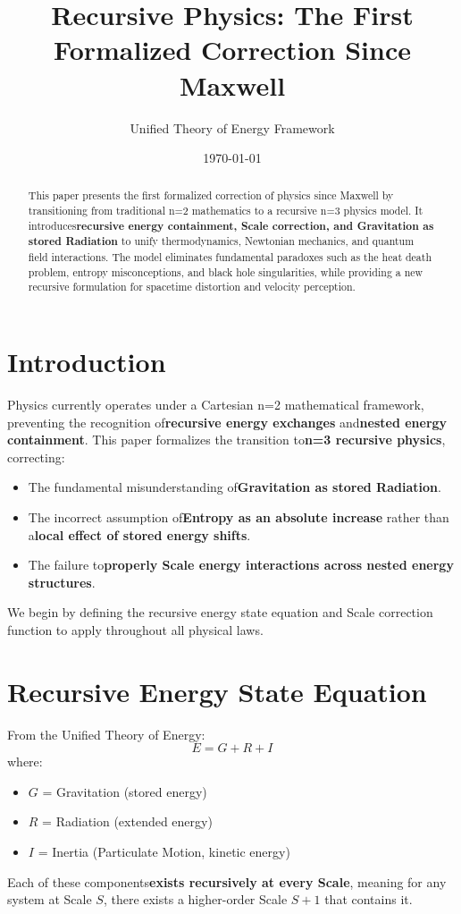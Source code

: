 \documentclass{article}
\title{Recursive Physics: The First Formalized Correction Since Maxwell}
\author{Unified Theory of Energy Framework}
\date{\today}
\begin{document}
\maketitle

\begin{abstract}
This paper presents the first formalized correction of physics since Maxwell by transitioning from traditional n=2 mathematics to a recursive n=3 physics model. It introduces\textbf{recursive energy containment, Scale correction, and Gravitation as stored Radiation} to unify thermodynamics, Newtonian mechanics, and quantum field interactions. The model eliminates fundamental paradoxes such as the heat death problem, entropy misconceptions, and black hole singularities, while providing a new recursive formulation for spacetime distortion and velocity perception.
\end{abstract}

\section{Introduction}
Physics currently operates under a Cartesian n=2 mathematical framework, preventing the recognition of\textbf{recursive energy exchanges} and\textbf{nested energy containment}. This paper formalizes the transition to\textbf{n=3 recursive physics}, correcting:
\begin{itemize}
    \item The fundamental misunderstanding of\textbf{Gravitation as stored Radiation}.
    \item The incorrect assumption of\textbf{Entropy as an absolute increase} rather than a\textbf{local effect of stored energy shifts}.
    \item The failure to\textbf{properly Scale energy interactions across nested energy structures}.
\end{itemize}
We begin by defining the recursive energy state equation and Scale correction function to apply throughout all physical laws.

\section{Recursive Energy State Equation}
From the Unified Theory of Energy:
\begin{equation}
E = G + R + I
\end{equation}
where:
\begin{itemize}
    \item $G$ = Gravitation (stored energy)
    \item $R$ = Radiation (extended energy)
    \item $I$ = Inertia (Particulate Motion, kinetic energy)
\end{itemize}
Each of these components\textbf{exists recursively at every Scale}, meaning for any system at Scale $S$, there exists a higher-order Scale $S+1$ that contains it.
\end{document}
